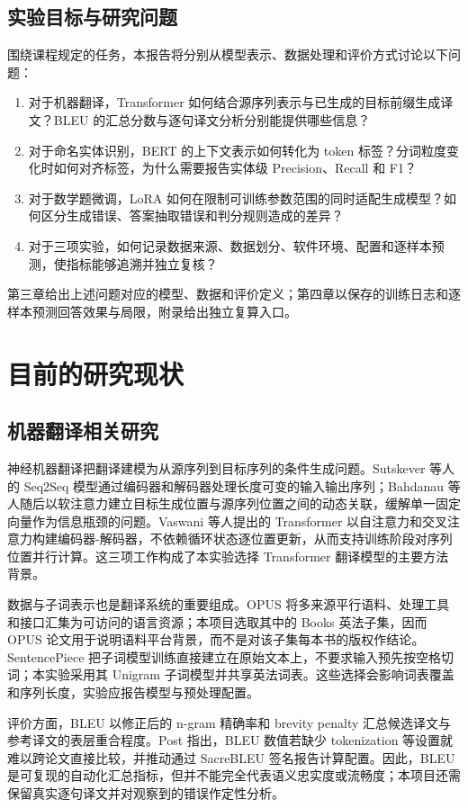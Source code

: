 \documentclass[UTF8,a4paper,12pt,fontset=none]{ctexart}
\begin{document}
\subsection{实验目标与研究问题}
围绕课程规定的任务，本报告将分别从模型表示、数据处理和评价方式讨论以下问题：
\begin{enumerate}
  \item 对于机器翻译，Transformer 如何结合源序列表示与已生成的目标前缀生成译文？BLEU 的汇总分数与逐句译文分析分别能提供哪些信息？
  \item 对于命名实体识别，BERT 的上下文表示如何转化为 token 标签？分词粒度变化时如何对齐标签，为什么需要报告实体级 Precision、Recall 和 F1？
  \item 对于数学题微调，LoRA 如何在限制可训练参数范围的同时适配生成模型？如何区分生成错误、答案抽取错误和判分规则造成的差异？
  \item 对于三项实验，如何记录数据来源、数据划分、软件环境、配置和逐样本预测，使指标能够追溯并独立复核？
\end{enumerate}
第三章给出上述问题对应的模型、数据和评价定义；第四章以保存的训练日志和逐样本预测回答效果与局限，附录给出独立复算入口。

\section{目前的研究现状}

\subsection{机器翻译相关研究}
神经机器翻译把翻译建模为从源序列到目标序列的条件生成问题。Sutskever 等人的 Seq2Seq 模型通过编码器和解码器处理长度可变的输入输出序列；Bahdanau 等人随后以软注意力建立目标生成位置与源序列位置之间的动态关联，缓解单一固定向量作为信息瓶颈的问题\cite{seq2seq,bahdanau}。Vaswani 等人提出的 Transformer 以自注意力和交叉注意力构建编码器-解码器，不依赖循环状态逐位置更新，从而支持训练阶段对序列位置并行计算\cite{transformer}。这三项工作构成了本实验选择 Transformer 翻译模型的主要方法背景。

数据与子词表示也是翻译系统的重要组成。OPUS 将多来源平行语料、处理工具和接口汇集为可访问的语言资源；本项目选取其中的 Books 英法子集，因而 OPUS 论文用于说明语料平台背景，而不是对该子集每本书的版权作结论\cite{opus}。SentencePiece 把子词模型训练直接建立在原始文本上，不要求输入预先按空格切词；本实验采用其 Unigram 子词模型并共享英法词表\cite{sentencepiece}。这些选择会影响词表覆盖和序列长度，实验应报告模型与预处理配置。

评价方面，BLEU 以修正后的 n-gram 精确率和 brevity penalty 汇总候选译文与参考译文的表层重合程度\cite{bleu}。Post 指出，BLEU 数值若缺少 tokenization 等设置就难以跨论文直接比较，并推动通过 SacreBLEU 签名报告计算配置\cite{post}。因此，BLEU 是可复现的自动化汇总指标，但并不能完全代表语义忠实度或流畅度；本项目还需保留真实逐句译文并对观察到的错误作定性分析。
\end{document}

